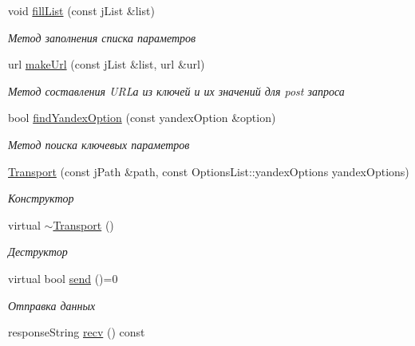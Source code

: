 \begin{DoxyCompactItemize}
void \hyperlink{classJarvis_1_1connection_1_1Transport_aeb9700e28a25af20c96beccf4b6b3aef}{fill\+List} (const j\+List \&list)
\begin{DoxyCompactList}\small\item\em Метод заполнения списка параметров \end{DoxyCompactList}\item 
url \hyperlink{classJarvis_1_1connection_1_1Transport_ab08175e845055cdd1ccbe7994f0c1973}{make\+Url} (const j\+List \&list, url \&url)
\begin{DoxyCompactList}\small\item\em Метод составления U\+RL\textquotesingle{}а из ключей и их значений для post запроса \end{DoxyCompactList}\item 
bool \hyperlink{classJarvis_1_1connection_1_1Transport_a41a2e836f9c20e4d4aae16ebcc895b8c}{find\+Yandex\+Option} (const yandex\+Option \&option)
\begin{DoxyCompactList}\small\item\em Метод поиска ключевых параметров \end{DoxyCompactList}\item 
\hyperlink{classJarvis_1_1connection_1_1Transport_a2fce583b7c16902b5c2f4ad492371e2c}{Transport} (const j\+Path \&path, const Options\+List\+::yandex\+Options yandex\+Options)
\begin{DoxyCompactList}\small\item\em Конструктор \end{DoxyCompactList}\item 
\mbox{\label{classJarvis_1_1connection_1_1Transport_aa074aa7a32a3bf78ec64aba07984b502}} 
virtual \hyperlink{classJarvis_1_1connection_1_1Transport_aa074aa7a32a3bf78ec64aba07984b502}{$\sim$\+Transport} ()
\begin{DoxyCompactList}\small\item\em Деструктор \end{DoxyCompactList}\item 
virtual bool \hyperlink{classJarvis_1_1connection_1_1Transport_ad0116f6773802fd75ea6795313051a96}{send} ()=0
\begin{DoxyCompactList}\small\item\em Отправка данных \end{DoxyCompactList}\item 
response\+String \hyperlink{classJarvis_1_1connection_1_1Transport_a25b1e13d35fe44466a4f5bdddd8ea499}{recv} () const

\end{DoxyCompactItemize}
